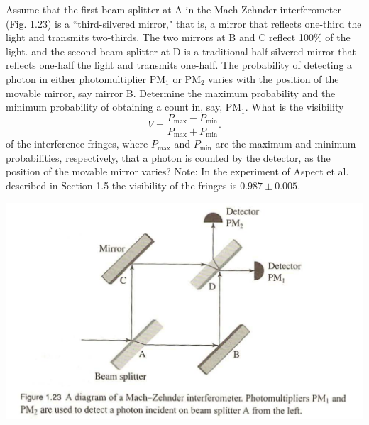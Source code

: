 \documentclass[12pt,letterpaper,boxed,cm]{hmcpset}
\newcommand{\f}[2]{\frac{#1}{#2}}
\begin{document}
\begin{problem}[Townsend 1.26]
	 Assume that the first beam splitter at A in the Mach-Zehnder interferometer (Fig. 1.23) is a ``third-silvered mirror," that is, a mirror that reflects one-third the light and transmits two-thirds. The two mirrors at B and C reflect 100\% of the light. and the second beam splitter at D is a traditional half-silvered mirror that reflects one-half the light and transmits one-half. The probability of detecting a photon in either photomultiplier $\text{PM}_1$ or $\text{PM}_2$ varies with the position of the movable mirror, say mirror B. Determine the maximum probability and the minimum probability of obtaining a count in, say, $\text{PM}_1$. What is the visibility
	 \[
	 	V = \f{P_{\text{max}} - P_{\text{min}}}{P_{\text{max}} + P_{\text{min}}}.
	 \]
	of the interference fringes, where $P_{\text{max}}$ and $P_{\text{min}}$ are the maximum and minimum probabilities, respectively, that a photon is counted by the detector, as the position of the movable mirror varies? Note: In the experiment of Aspect et al. described in Section 1.5 the visibility of the fringes is $0.987 \pm 0.005$.
	 \begin{center}
	 	\includegraphics[scale=0.6]{pic01.png}	
	 \end{center}
\end{problem}
\begin{solution}
\end{solution}
\end{document}
